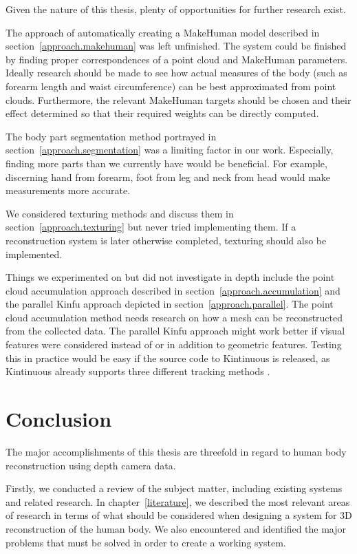 Given the nature of this thesis, plenty of opportunities for further research exist.

The approach of automatically creating a MakeHuman model described in section~\ref{approach.makehuman} was left unfinished. The system could be finished by finding proper correspondences of a point cloud and MakeHuman parameters. Ideally research should be made to see how actual measures of the body (such as forearm length and waist circumference) can be best approximated from point clouds. Furthermore, the relevant MakeHuman targets should be chosen and their effect determined so that their required weights can be directly computed.

The body part segmentation method portrayed in section~\ref{approach.segmentation} was a limiting factor in our work. Especially, finding more parts than we currently have would be beneficial. For example, discerning hand from forearm, foot from leg and neck from head would make measurements more accurate.

We considered texturing methods and discuss them in section~\ref{approach.texturing} but never tried implementing them. If a reconstruction system is later otherwise completed, texturing should also be implemented.

Things we experimented on but did not investigate in depth include the point cloud accumulation approach described in section~\ref{approach.accumulation} and the parallel Kinfu approach depicted in section~\ref{approach.parallel}. The point cloud accumulation method needs research on how a mesh can be reconstructed from the collected data. The parallel Kinfu approach might work better if visual features were considered instead of or in addition to geometric features. Testing this in practice would be easy if the source code to Kintinuous is released, as Kintinuous already supports three different tracking methods \citep{Whelan12rssw}.



\section{Conclusion}

The major accomplishments of this thesis are threefold in regard to human body reconstruction using depth camera data.

Firstly, we conducted a review of the subject matter, including existing systems and related research. In chapter~\ref{literature}, we described the most relevant areas of research in terms of what should be considered when designing a system for 3D reconstruction of the human body. We also encountered and identified the major problems that must be solved in order to create a working system.


